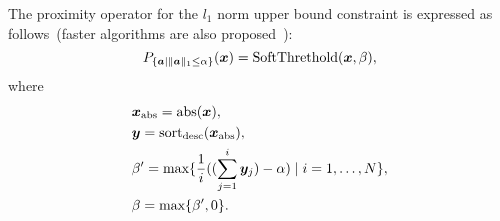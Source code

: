 The proximity operator for the $l_1$ norm upper bound constraint is expressed as follows~\cite{L1-ball-projection}(faster algorithms are also proposed~\cite{fast-L1-ball-projection}):
\begin{equation} \label{eq:ProximityOperatorForL1Ball}  \projLOneBallSolution, \end{equation}
where
\begin{equation} \label{eq:ProximityOperatorForL1BallWhere} \projLOneBallSolutionWhere \notag \end{equation}

